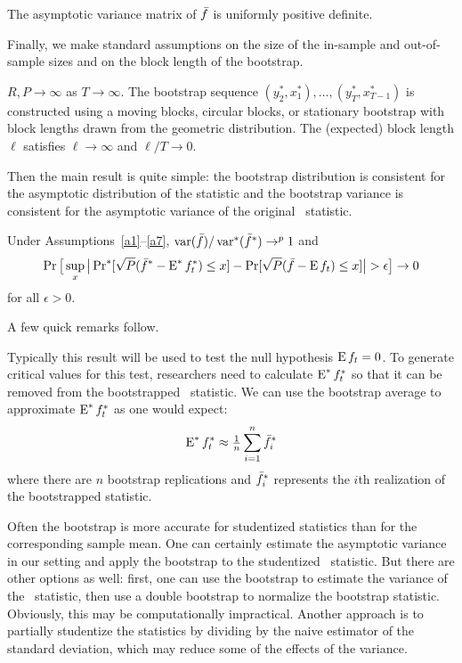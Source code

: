 \documentclass[12pt,fleqn]{article}
\begin{document}
\begin{asmp}\label{a6}
  The asymptotic variance matrix of $\bar f$ is uniformly positive definite.
\end{asmp}

Finally, we make standard assumptions on the size of the in-sample and
out-of-sample sizes and on the block length of the bootstrap.

\begin{asmp}\label{a7}
  $R, P \to \infty$ as $T \to \infty$.
  The bootstrap sequence $(y_2^*, x_1^*),\dots,(y_T^*, x_{T-1}^*)$ is
  constructed using a moving blocks, circular blocks, or stationary
  bootstrap with block lengths drawn from the geometric distribution.
  The (expected) block length $\ell$ satisfies $\ell \to \infty$
  and $\ell/T \to 0$.
\end{asmp}

Then the main result is quite simple: the bootstrap distribution is
consistent for the asymptotic distribution of the statistic and the
bootstrap variance is consistent for the asymptotic variance of the
original \oos\ statistic.

\begin{thm}\label{res:3}
  Under Assumptions~\ref{a1}--\ref{a7}, $\operatorname{var}(\bar f)/\operatorname{var}^*(\bar f^*)
  \to^p 1$ and
  \begin{equation}\label{eq:15}
    \operatorname{Pr}\big[\sup_x \big\lvert \operatorname{Pr}^*[\sqrt{P} (\bar f^* - \operatorname{E}^* f_t^*) \leq x]
    - \operatorname{Pr}[\sqrt{P}( \bar{f} - \operatorname{E} f_t) \leq x] \big\rvert > \epsilon\big] \to 0
  \end{equation}
  for all $\epsilon > 0$.
\end{thm}

A few quick remarks follow.
\begin{rem}
  Typically this result will be used to test the null hypothesis $\operatorname{E}
  f_t = 0$. To generate critical values for this test, researchers
  need to calculate $\operatorname{E}^* f_t^*$ so that it can be removed from the
  bootstrapped \oos\ statistic. We can use the bootstrap average to
  approximate $\operatorname{E}^* f_t^*$ as one would expect:
  \begin{equation*}
    \operatorname{E}^* f_t^* \approx \tfrac{1}{n} \sum_{i=1}^n \bar f_i^*
  \end{equation*}
  where there are $n$ bootstrap replications and $\bar f_i^*$ represents
  the $i$th realization of the bootstrapped statistic.
\end{rem}

\begin{rem}
  Often the bootstrap is more accurate for studentized statistics than
  for the corresponding sample mean. One can certainly estimate the
  asymptotic variance in our setting and apply the bootstrap to the
  studentized \oos\ statistic. But there are other options as well:
  first, one can use the bootstrap to estimate the variance of the
  \oos\ statistic, then use a double bootstrap to normalize the
  bootstrap statistic. Obviously, this may be computationally
  impractical. Another approach is to partially studentize the
  statistics by dividing by the naive estimator of the standard
  deviation, which may reduce some of the effects of the variance.
\end{rem}
\end{document}
